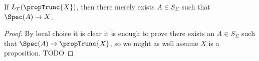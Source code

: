 \begin{lemma}
If $L_T(\propTrunc{X})$, then there merely exists $A\in S_\Sigma$ such that $\Spec(A)\to X$.
\end{lemma}

\begin{proof}
By local choice it is clear it is enough to prove there exists an $A\in S_\Sigma$ such that $\Spec(A)\to \propTrunc{X}$, so we might as well assume $X$ is a proposition. TODO 
\end{proof}





